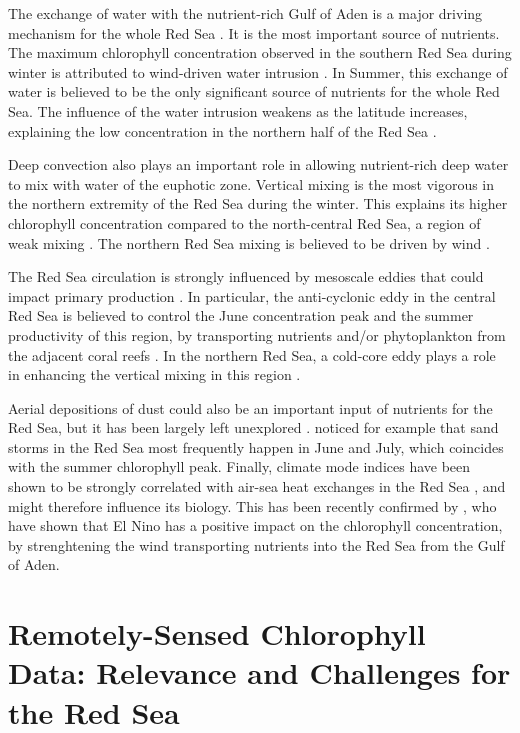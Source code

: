 The exchange of water with the nutrient-rich Gulf of Aden is a major driving
mechanism for the whole Red Sea \citep{Triantafyllou2014}. It is the most
important source of nutrients. The maximum chlorophyll concentration observed
in the southern Red Sea during winter is attributed to wind-driven water
intrusion \citep{Raitsos2013}. In Summer, this exchange of water is believed to
be the only significant source of nutrients for the whole Red Sea. The
influence of the water intrusion weakens as the latitude increases, explaining
the low concentration in the northern half of the Red Sea \citep{Raitsos2013}.

Deep convection also plays an important role in allowing nutrient-rich deep
water to mix with water of the euphotic zone. Vertical mixing is the most
vigorous in the northern extremity of the Red Sea during the winter. This
explains its higher chlorophyll concentration compared to the north-central Red
Sea, a region of weak mixing \citep{Raitsos2013}. The northern Red Sea mixing
is believed to be driven by wind \citep{Raitsos2013}.

The Red Sea circulation is strongly influenced by mesoscale eddies
\citep{Yao2014, Yao2014b, Zhan2014} that could impact primary production
\citep{Zhai2013}.  In particular, the anti-cyclonic eddy in the central Red Sea
is believed to control the June concentration peak and the summer productivity
of this region, by transporting nutrients and/or phytoplankton from the
adjacent coral reefs \citep{Raitsos2013}. In the northern Red Sea, a cold-core
eddy plays a role in enhancing the vertical mixing in this region
\citep{Raitsos2013}.

Aerial depositions of dust could also be an important input of nutrients for
the Red Sea, but it has been largely left unexplored \citep{Triantafyllou2014}.
\citet{Raitsos2013} noticed for example that sand storms in the Red Sea most
frequently happen in June and July, which coincides with the summer chlorophyll
peak. Finally, climate mode indices have been shown to be strongly correlated
with air-sea heat exchanges in the Red Sea \citep{Abualnaja2015}, and might
therefore influence its biology. This has been recently confirmed by
\citet{Raitsos2015}, who have shown that El Nino has a positive impact on the
chlorophyll concentration, by strenghtening the wind transporting nutrients
into the Red Sea from the Gulf of Aden.

\section{Remotely-Sensed Chlorophyll Data: Relevance and Challenges for the Red
Sea}

